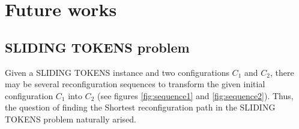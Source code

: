 
\section{Future works}

\subsection{SLIDING TOKENS problem}
Given a SLIDING TOKENS instance and two configurations $C_1$ and $C_2$, there may be several reconfiguration sequences to transform the given
initial configuration $C_1$ into $C_2$ (see figures \ref{fig:sequence1} and \ref{fig:sequence2}). Thus, the question of finding the
Shortest reconfiguration path in the SLIDING TOKENS problem naturally arised.


